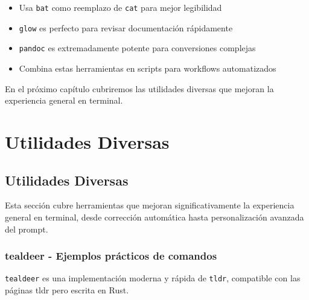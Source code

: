 \documentclass[
  11pt,
  letterpaper,
  oneside,
  openany]{scrbook}
\providecommand{\tightlist}{%
  \setlength{\itemsep}{0pt}\setlength{\parskip}{0pt}}
\begin{document}
\begin{tcolorbox}[enhanced jigsaw, toprule=.15mm, bottomrule=.15mm, opacityback=0, coltitle=black, rightrule=.15mm, colframe=quarto-callout-tip-color-frame, titlerule=0mm, opacitybacktitle=0.6, left=2mm, colback=white, bottomtitle=1mm, arc=.35mm, leftrule=.75mm, title=\textcolor{quarto-callout-tip-color}{\faLightbulb}\hspace{0.5em}{Tips para documentación}, colbacktitle=quarto-callout-tip-color!10!white, breakable, toptitle=1mm]

\begin{itemize}
\tightlist
\item
  Usa \texttt{bat} como reemplazo de \texttt{cat} para mejor legibilidad
\item
  \texttt{glow} es perfecto para revisar documentación rápidamente
\item
  \texttt{pandoc} es extremadamente potente para conversiones complejas
\item
  Combina estas herramientas en scripts para workflows automatizados
\end{itemize}

\end{tcolorbox}

En el próximo capítulo cubriremos las utilidades diversas que mejoran la
experiencia general en terminal.

\part{Utilidades Diversas}

\chapter{Utilidades Diversas}\label{utilidades-diversas-3}

Esta sección cubre herramientas que mejoran significativamente la
experiencia general en terminal, desde corrección automática hasta
personalización avanzada del prompt.

\section{tealdeer - Ejemplos prácticos de comandos}\label{sec-tealdeer}

\texttt{tealdeer} es una implementación moderna y rápida de
\texttt{tldr}, compatible con las páginas tldr pero escrita en Rust.
\end{document}

